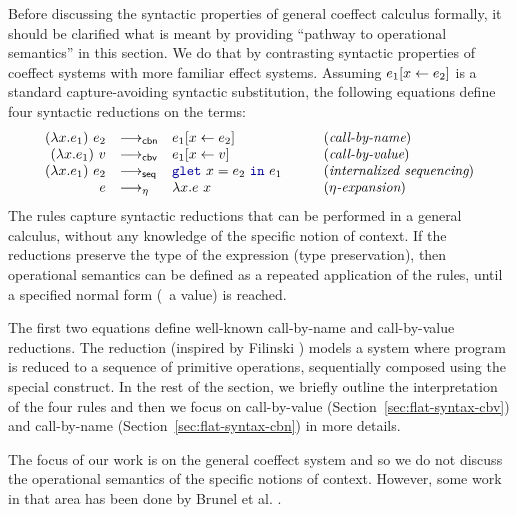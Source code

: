 Before discussing the syntactic properties of general coeffect calculus formally, it should be 
clarified what is meant by providing ``pathway to operational semantics'' in this section. We do
that by contrasting syntactic properties of coeffect systems with more familiar effect systems.
Assuming $e_1[x \leftarrow e_2]$ is a standard capture-avoiding syntactic substitution, the following
equations define four syntactic reductions on the terms:
%
\begin{equation*}
\begin{array}{rllcl}
(\lambda x.e_1)~e_2 &{\reduce_{\ident{cbn}}}& \subst{e_1}{x}{e_2}   &&(\textit{call-by-name})\\
(\lambda x.e_1)~v   &{\reduce_{\ident{cbv}}}& \subst{e_1}{x}{v}     &\quad&(\textit{call-by-value})\\
(\lambda x.e_1)~e_2 &{\reduce_{\ident{seq}}}& \kvd{glet}~x=e_2~\kvd{in}~e_1  &&(\textit{internalized sequencing})\\
e &{\reduce_\eta}& \lambda x.e~x                                    &&(\textit{$\eta$-expansion})
\end{array}
\end{equation*}
%
The rules capture syntactic reductions that can be performed in a general calculus, without any 
knowledge of the specific notion of context. If the reductions preserve the type of the expression
(type preservation), then operational semantics can be defined as a repeated application of the 
rules, until a specified normal form (\ie~a value) is reached.

The first two equations define well-known call-by-name and call-by-value reductions. The  
reduction (inspired by Filinski \cite{monads-inaction}) models a system where program is reduced to 
a sequence of primitive operations, sequentially composed using the special  construct. 
In the rest of the section, we briefly outline the interpretation of the four 
rules and then we focus on call-by-value (Section~\ref{sec:flat-syntax-cbv}) and call-by-name 
(Section~\ref{sec:flat-syntax-cbn}) in more details.

The focus of our work is on the general coeffect system and so we do not discuss the operational
semantics of the specific notions of context. However, some work in that area has been done
by Brunel et al. \cite{coeffects-quantitative}.

